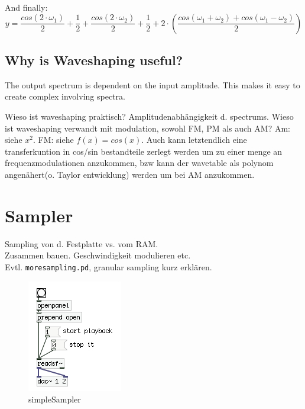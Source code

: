 And finally:
\begin{equation}
	y = \frac{cos(2 \cdot \omega_1)}{2} + \frac{1}{2} + \frac{cos(2 \cdot \omega_2)}{2} +\frac{1}{2} + 2 \cdot (\frac{cos(\omega_1+\omega_2) + cos(\omega_1-\omega_2)}{2})
\end{equation}



\subsection{Why is Waveshaping useful?}
The output spectrum is dependent on the input amplitude. This makes it easy to create complex involving spectra.

Wieso ist waveshaping praktisch? Amplitudenabhängigkeit d. spectrums.
Wieso ist waveshaping verwandt mit modulation, sowohl FM, PM als auch AM? Am: siehe \(x^2\). FM: siehe \(f(x)=cos(x)\). Auch kann letztendlich eine transferkuntion in cos/sin bestandteile zerlegt werden um zu einer menge an frequenzmodulationen anzukommen, bzw kann der wavetable als polynom angenähert(o. Taylor entwicklung) werden um bei AM anzukommen.



\section{Sampler}

Sampling von d. Festplatte vs. vom RAM.\\
Zusammen bauen. Geschwindigkeit modulieren etc.\\
Evtl. \texttt{moresampling.pd}, granular sampling kurz erklären.


\begin{figure}[H]
	\begin{center}
		\includegraphics[scale = 1]{img/sampler.png}
		\caption{simpleSampler}
		\label{fig:simpleSampler}
	\end{center}
\end{figure}

